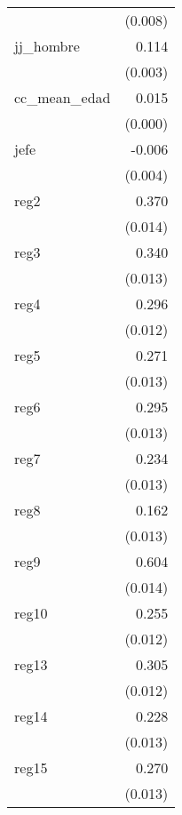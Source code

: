 {\begin{longtable}{l*{1}{D{.}{.}{-1}}}
            &     (0.008)         \\
\addlinespace
jj\_hombre   &       0.114\sym{***}\\
            &     (0.003)         \\
\addlinespace
cc\_mean\_edad&       0.015\sym{***}\\
            &     (0.000)         \\
\addlinespace
jefe        &      -0.006         \\
            &     (0.004)         \\
\addlinespace
reg2        &       0.370\sym{***}\\
            &     (0.014)         \\
\addlinespace
reg3        &       0.340\sym{***}\\
            &     (0.013)         \\
\addlinespace
reg4        &       0.296\sym{***}\\
            &     (0.012)         \\
\addlinespace
reg5        &       0.271\sym{***}\\
            &     (0.013)         \\
\addlinespace
reg6        &       0.295\sym{***}\\
            &     (0.013)         \\
\addlinespace
reg7        &       0.234\sym{***}\\
            &     (0.013)         \\
\addlinespace
reg8        &       0.162\sym{***}\\
            &     (0.013)         \\
\addlinespace
reg9        &       0.604\sym{***}\\
            &     (0.014)         \\
\addlinespace
reg10       &       0.255\sym{***}\\
            &     (0.012)         \\
\addlinespace
reg13       &       0.305\sym{***}\\
            &     (0.012)         \\
\addlinespace
reg14       &       0.228\sym{***}\\
            &     (0.013)         \\
\addlinespace
reg15       &       0.270\sym{***}\\
            &     (0.013)         \\

\end{longtable}}
